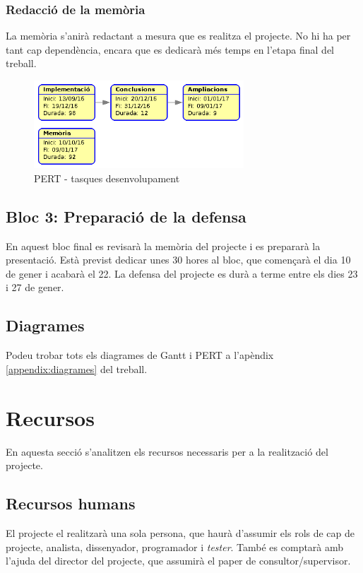 		\subsubsection{Redacció de la memòria}
			La memòria s'anirà redactant a mesura que es realitza el projecte. No hi ha per tant cap dependència, encara que es dedicarà més temps en l'etapa final del treball.\\

		\begin{figure}[H]
			\centering
			\includegraphics[width=0.7\textwidth]{images/pert-dev}
			\caption{PERT - tasques desenvolupament}
		\end{figure}

	\subsection{Bloc 3: Preparació de la defensa}
	En aquest bloc final es revisarà la memòria del projecte i es prepararà la presentació. Està previst dedicar unes 30 hores al bloc, que començarà el dia 10 de gener i acabarà el 22.
	La defensa del projecte es durà a terme entre els dies 23 i 27 de gener.

	\subsection{Diagrames}
		Podeu trobar tots els diagrames de Gantt i PERT a l'apèndix \ref{appendix:diagrames} del treball.

\section{Recursos}
	En aquesta secció s'analitzen els recursos necessaris per a la realització del projecte. %
	\subsection{Recursos humans}
		El projecte el realitzarà una sola persona, que haurà d'assumir els rols de cap de projecte, analista, dissenyador, programador i \textit{tester}.
		També es comptarà amb l'ajuda del director del projecte, que assumirà el paper de consultor/supervisor.

